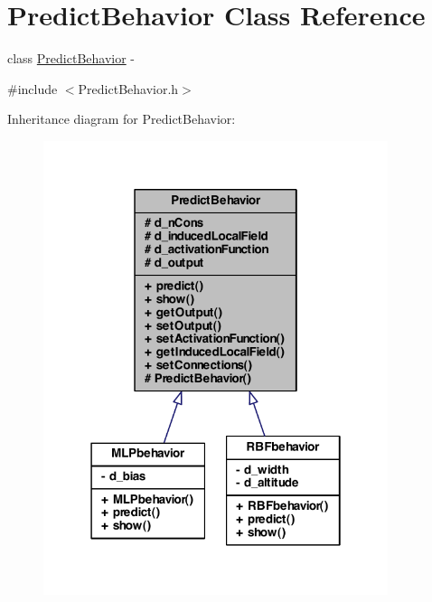\hypertarget{class_predict_behavior}{
\section{PredictBehavior Class Reference}
\label{class_predict_behavior}
}


class \hyperlink{class_predict_behavior}{PredictBehavior} -\/  




{\ttfamily \#include $<$PredictBehavior.h$>$}



Inheritance diagram for PredictBehavior:
\nopagebreak
\begin{figure}[H]
\begin{center}
\leavevmode
\includegraphics[width=286pt]{class_predict_behavior__inherit__graph}
\end{center}
\end{figure}
